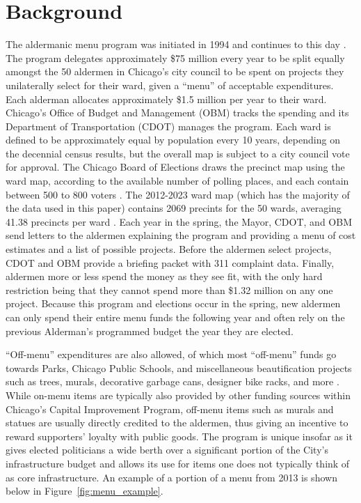 \section{Background}\label{sec:background}

The aldermanic menu program was initiated in 1994 and continues to this day \citep{OIGaudit}. 
The program delegates approximately \$75 million every year to be split equally amongst the 50 aldermen in Chicago's city council to be spent on projects they unilaterally select for their ward, given a ``menu'' of acceptable expenditures. 
Each alderman allocates approximately \$1.5 million per year to their ward.
Chicago's Office of Budget and Management (OBM) tracks the spending and its Department of Transportation (CDOT) manages the program.
Each ward is defined to be approximately equal by population every 10 years, depending on the decennial census results, but the overall map is subject to a city council vote for approval.
The Chicago Board of Elections draws the precinct map using the ward map, according to the available number of polling places, and each contain between 500 to 800 voters \citep{Crowley_2022}.
The 2012-2023 ward map (which has the majority of the data used in this paper) contains 2069 precints for the 50 wards, averaging 41.38 precincts per ward \citep{Crowley_2022}.
Each year in the spring, the Mayor, CDOT, and OBM send letters to the aldermen explaining the program and providing a menu of cost estimates and a list of possible projects.
Before the aldermen select projects, CDOT and OBM provide a briefing packet with 311 complaint data.
Finally, aldermen more or less spend the money as they see fit, with the only hard restriction being that they cannot spend more than \$1.32 million on any one project.
Because this program and elections occur in the spring, new aldermen can only spend their entire menu funds the following year and often rely on the previous Alderman's programmed budget the year they are elected.

``Off-menu'' expenditures are also allowed, of which most ``off-menu'' funds go towards Parks, Chicago Public Schools, and miscellaneous beautification projects such as trees, murals, decorative garbage cans, designer bike racks, and more \citep{OIGaudit}. 
While on-menu items are typically also provided by other funding sources within Chicago's Capital Improvement Program, off-menu items such as murals and statues are usually directly credited to the aldermen, thus giving an incentive to reward supporters' loyalty with public goods.
The program is unique insofar as it gives elected politicians a wide berth over a significant portion of the City's infrastructure budget and allows its use for items one does not typically think of as core infrastructure. 
An example of a portion of a menu from 2013 is shown below in Figure~\ref{fig:menu_example}.


